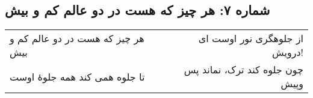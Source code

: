 \begin{center}
\section*{شماره ۷: هر چیز که هست در دو عالم کم و بیش}
\label{sec:007}
\begin{longtable}{l p{0.5cm} r}
هر چیز که هست در دو عالم کم و بیش
&&
از جلوهگری نور اوست ای درویش!
\\
تا جلوه همی کند همه جلوهٔ اوست
&&
چون جلوه کند ترک، نماند پس وپیش
\\
\end{longtable}
\end{center}
